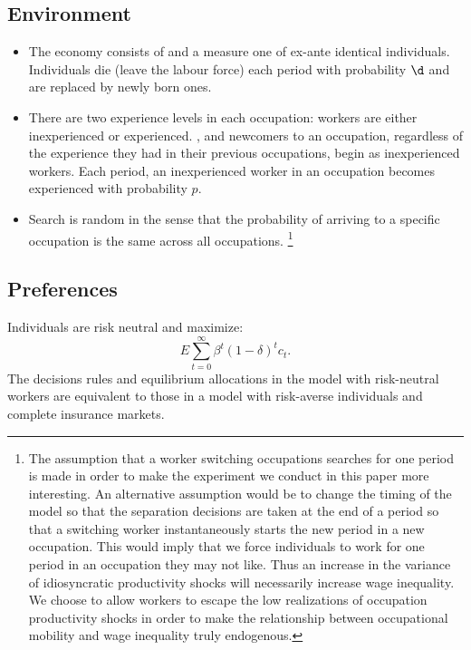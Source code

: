 \documentclass[12pt]{article}
\newcommand{\highlightP}[1]{{\emph{\color{MyPink}{#1}}}}
\theoremstyle{definition}
\begin{document}
\subsection{Environment}
\begin{itemize}
	\item The economy consists of \highlightP{a continuum of occupations} and a measure one of ex-ante identical individuals. Individuals die (leave the labour force) each period with probability $\d$ and are replaced by newly born ones.
	\item There are two experience levels in each occupation: workers are either inexperienced or experienced. \highlightP{Experience is occupation specific}, and newcomers to an occupation, regardless of the experience they had in their previous occupations, begin as inexperienced workers. Each period, an inexperienced worker in an occupation becomes experienced with probability $p$.
	\item \highlightP{Those who, at the beginning of the period, decide to leave their occupation, search for one period and arrive in a new occupation at the beginning of the next period.} Search is random in the sense that the probability of arriving to a specific occupation is the same across all occupations. \footnote{The assumption that a worker switching occupations searches for one period is made in order to make the experiment we conduct in this paper more interesting. An alternative assumption would be to change the timing of the model so that the separation decisions are taken at the end of a period so that a switching worker instantaneously starts the new period in a new occupation. This would imply that we force individuals to work for one period in an occupation they may not like. Thus an increase in the variance of idiosyncratic productivity shocks will necessarily increase wage inequality. We choose to allow workers to escape the low realizations of occupation productivity shocks in order to make the relationship between occupational mobility and wage inequality truly endogenous. }
\end{itemize}

\subsection{Preferences}
Individuals are risk neutral and maximize:
\begin{equation}
	\label{3}
	E \sum_{t=0}^{\infty} \beta^t(1-\delta)^t c_t .
\end{equation}
{The decisions rules and equilibrium allocations in the model with risk-neutral workers are equivalent to those in a model with risk-averse individuals and complete insurance markets.}
\end{document}
